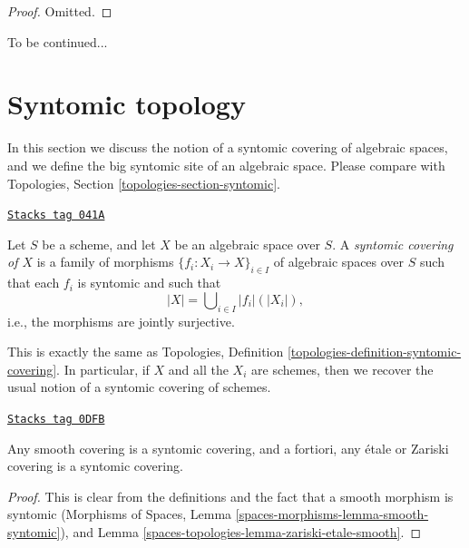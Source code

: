 \begin{proof}
Omitted.
\end{proof}

To be continued...

\section{Syntomic topology}
\label{spaces-topologies-section-syntomic}
In this section we discuss the notion of a syntomic covering of
algebraic spaces, and we define the big syntomic site of an
algebraic space. Please compare with
Topologies, Section \ref{topologies-section-syntomic}.

\begin{definition}
\label{spaces-topologies-definition-syntomic-covering}
\href{https://stacks.math.columbia.edu/tag/041A}{\texttt{Stacks tag 041A}}

Let $S$ be a scheme, and let $X$ be an algebraic space over $S$.
A {\it syntomic covering of $X$} is a family of morphisms
$\{f_i : X_i \to X\}_{i \in I}$ of algebraic spaces over $S$
such that each $f_i$ is syntomic
and such that
$$
|X| = \bigcup\nolimits_{i \in I} |f_i|(|X_i|),
$$
i.e., the morphisms are jointly surjective.
\end{definition}

This is exactly the same as
Topologies, Definition \ref{topologies-definition-syntomic-covering}.
In particular, if $X$ and all the $X_i$ are schemes, then we recover the
usual notion of a syntomic covering of schemes.

\begin{lemma}
\label{spaces-topologies-lemma-zariski-etale-smooth-syntomic}
\href{https://stacks.math.columbia.edu/tag/0DFB}{\texttt{Stacks tag 0DFB}}

Any smooth covering is a syntomic covering, and a fortiori,
any \'etale or Zariski covering is a syntomic covering.
\end{lemma}

\begin{proof}
This is clear from the definitions and the fact that a smooth
morphism is syntomic
(Morphisms of Spaces, Lemma \ref{spaces-morphisms-lemma-smooth-syntomic}),
and Lemma \ref{spaces-topologies-lemma-zariski-etale-smooth}.
\end{proof}

